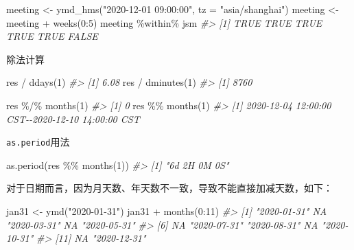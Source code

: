 \documentclass[
]{book}
\newenvironment{Shaded}{\begin{snugshade}}{\end{snugshade}}
\newcommand{\AttributeTok}[1]{\textcolor[rgb]{0.77,0.63,0.00}{#1}}
\newcommand{\CommentTok}[1]{\textcolor[rgb]{0.56,0.35,0.01}{\textit{#1}}}
\newcommand{\DecValTok}[1]{\textcolor[rgb]{0.00,0.00,0.81}{#1}}
\newcommand{\FunctionTok}[1]{\textcolor[rgb]{0.00,0.00,0.00}{#1}}
\newcommand{\NormalTok}[1]{#1}
\newcommand{\OtherTok}[1]{\textcolor[rgb]{0.56,0.35,0.01}{#1}}
\newcommand{\SpecialCharTok}[1]{\textcolor[rgb]{0.00,0.00,0.00}{#1}}
\newcommand{\StringTok}[1]{\textcolor[rgb]{0.31,0.60,0.02}{#1}}
\begin{document}
\begin{Shaded}
\begin{Highlighting}[]
\NormalTok{meeting }\OtherTok{\textless{}{-}} \FunctionTok{ymd\_hms}\NormalTok{(}\StringTok{"2020{-}12{-}01 09:00:00"}\NormalTok{, }\AttributeTok{tz =} \StringTok{"asia/shanghai"}\NormalTok{)}
\NormalTok{meeting }\OtherTok{\textless{}{-}}\NormalTok{ meeting }\SpecialCharTok{+} \FunctionTok{weeks}\NormalTok{(}\DecValTok{0}\SpecialCharTok{:}\DecValTok{5}\NormalTok{)}
\NormalTok{meeting }\SpecialCharTok{\%within\%}\NormalTok{ jsm}
\CommentTok{\#\textgreater{} [1]  TRUE  TRUE  TRUE  TRUE  TRUE FALSE}
\end{Highlighting}
\end{Shaded}

除法计算

\begin{Shaded}
\begin{Highlighting}[]
\NormalTok{res }\SpecialCharTok{/} \FunctionTok{ddays}\NormalTok{(}\DecValTok{1}\NormalTok{)}
\CommentTok{\#\textgreater{} [1] 6.08}
\NormalTok{res }\SpecialCharTok{/} \FunctionTok{dminutes}\NormalTok{(}\DecValTok{1}\NormalTok{)}
\CommentTok{\#\textgreater{} [1] 8760}


\NormalTok{res }\SpecialCharTok{\%/\%} \FunctionTok{months}\NormalTok{(}\DecValTok{1}\NormalTok{)}
\CommentTok{\#\textgreater{} [1] 0}
\NormalTok{res }\SpecialCharTok{\%\%} \FunctionTok{months}\NormalTok{(}\DecValTok{1}\NormalTok{)}
\CommentTok{\#\textgreater{} [1] 2020{-}12{-}04 12:00:00 CST{-}{-}2020{-}12{-}10 14:00:00 CST}
\end{Highlighting}
\end{Shaded}

\texttt{as.period}用法

\begin{Shaded}
\begin{Highlighting}[]
\FunctionTok{as.period}\NormalTok{(res }\SpecialCharTok{\%\%} \FunctionTok{months}\NormalTok{(}\DecValTok{1}\NormalTok{))}
\CommentTok{\#\textgreater{} [1] "6d 2H 0M 0S"}
\end{Highlighting}
\end{Shaded}

对于日期而言，因为月天数、年天数不一致，导致不能直接加减天数，如下：

\begin{Shaded}
\begin{Highlighting}[]
\NormalTok{jan31 }\OtherTok{\textless{}{-}} \FunctionTok{ymd}\NormalTok{(}\StringTok{"2020{-}01{-}31"}\NormalTok{)}
\NormalTok{jan31 }\SpecialCharTok{+} \FunctionTok{months}\NormalTok{(}\DecValTok{0}\SpecialCharTok{:}\DecValTok{11}\NormalTok{)}
\CommentTok{\#\textgreater{}  [1] "2020{-}01{-}31" NA           "2020{-}03{-}31" NA           "2020{-}05{-}31"}
\CommentTok{\#\textgreater{}  [6] NA           "2020{-}07{-}31" "2020{-}08{-}31" NA           "2020{-}10{-}31"}
\CommentTok{\#\textgreater{} [11] NA           "2020{-}12{-}31"}
\end{Highlighting}
\end{Shaded}
\end{document}
